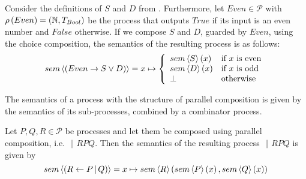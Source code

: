 \begin{example}
\label{exp:sem_chice}
Consider the definitions of $S$ and $D$ from . Furthermore, let $Even \in \mathcal{P}$ with $\rho \left( Even \right) = \left( \mathbb{N}, T_{Bool} \right)$ be the process that outputs $True$ if its input is an even number and $False$ otherwise. If we compose $S$ and $D$, guarded by $Even$, using the choice composition, the semantics of the resulting process is as follows:
  \begin{equation*}
    sem \left\langle \left( Even \to S \vee D \right) \right\rangle = x \mapsto \left\{\begin{array}{ll}
      sem \left\langle S \right\rangle\left(x\right) & \text{if } x \text{ is even} \\
      sem \left\langle D \right\rangle\left(x\right) & \text{if } x \text{ is odd} \\
      \bot & \text{otherwise}
    \end{array}\right.
  \end{equation*}
\end{example}


The semantics of a process with the structure of parallel composition is given by the semantics of its sub-processes, combined by a combinator process.
\begin{definition}
\label{def:sem_parallel}
Let $P, Q, R \in \mathcal{P}$ be processes and let them be composed using parallel composition, i.e. $\parallel{R}{P}{Q}$. Then the semantics of the resulting process $\parallel{R}{P}{Q}$ is given by
  \begin{equation*}
    \label{eqn:sem_parallel}
    sem \left\langle \left( R \gets P \, | \, Q \right) \right\rangle = x \mapsto sem \left\langle R \right\rangle \left( sem \left\langle P \right\rangle \left( x \right), sem \left\langle Q \right\rangle \left( x \right) \right)
  \end{equation*}
  \hfill\qedsymbol
\end{definition}


